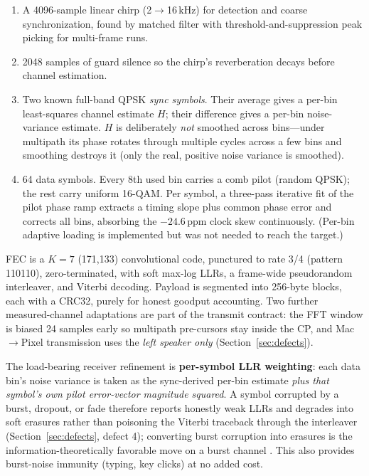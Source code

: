 \documentclass[11pt]{article}
\begin{document}
\begin{enumerate}
  \item A 4096-sample linear chirp (2$\to$16\,kHz) for detection and coarse
        synchronization, found by matched filter with threshold-and-suppression
        peak picking for multi-frame runs.
  \item 2048 samples of guard silence so the chirp's reverberation decays
        before channel estimation.
  \item Two known full-band QPSK \emph{sync symbols}. Their average gives a
        per-bin least-squares channel estimate $H$; their difference gives a
        per-bin noise-variance estimate. $H$ is deliberately \emph{not}
        smoothed across bins---under multipath its phase rotates through
        multiple cycles across a few bins and smoothing destroys it (only the
        real, positive noise variance is smoothed).
  \item 64 data symbols. Every 8th used bin carries a comb pilot (random
        QPSK); the rest carry uniform 16-QAM. Per symbol, a three-pass
        iterative fit of the pilot phase ramp extracts a timing slope plus
        common phase error and corrects all bins, absorbing the $-24.6$\,ppm
        clock skew continuously. (Per-bin adaptive loading is implemented but
        was not needed to reach the target.)
\end{enumerate}

FEC is a $K{=}7$ (171,133) convolutional code, punctured to rate 3/4
(pattern 110110), zero-terminated, with soft max-log LLRs, a frame-wide
pseudorandom interleaver, and Viterbi decoding. Payload is segmented into
256-byte blocks, each with a CRC32, purely for honest goodput accounting.
Two further measured-channel adaptations are part of the transmit contract:
the FFT window is biased 24 samples early so multipath pre-cursors stay inside
the CP, and Mac$\rightarrow$Pixel transmission uses the \emph{left speaker
only} (Section~\ref{sec:defects}).

The load-bearing receiver refinement is \textbf{per-symbol LLR weighting}:
each data bin's noise variance is taken as the sync-derived per-bin estimate
\emph{plus that symbol's own pilot error-vector magnitude squared}. A symbol
corrupted by a burst, dropout, or fade therefore reports honestly weak LLRs
and degrades into soft erasures rather than poisoning the Viterbi traceback
through the interleaver (Section~\ref{sec:defects}, defect 4); converting
burst corruption into erasures is the information-theoretically favorable move
on a burst channel \cite{bursterasure}. This also provides burst-noise
immunity (typing, key clicks) at no added cost.
\end{document}
